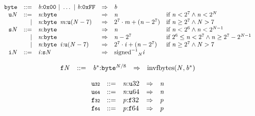 \vspace{1ex}

\vspace{1ex}

$$
\begin{array}{@{}l@{}rrlll@{}l@{}}
& {\mathtt{byte}} &::=& {\mathit{b}}{:}\mathtt{0x00} ~|~ \dots ~|~ {\mathit{b}}{:}\mathtt{0xFF} &\Rightarrow& {\mathit{b}} \\
& {{\mathtt{u}}}{{\mathit{N}}} &::=& {\mathit{n}}{:}{\mathtt{byte}} &\Rightarrow& {\mathit{n}} &\quad
  \mbox{if}~{\mathit{n}} < {2^{7}} \land {\mathit{n}} < {2^{{\mathit{N}}}} \\ &&|&
{\mathit{n}}{:}{\mathtt{byte}}~\,{\mathit{m}}{:}{{\mathtt{u}}}{({\mathit{N}} - 7)} &\Rightarrow& {2^{7}} \cdot {\mathit{m}} + ({\mathit{n}} - {2^{7}}) &\quad
  \mbox{if}~{\mathit{n}} \geq {2^{7}} \land {\mathit{N}} > 7 \\
& {{\mathtt{s}}}{{\mathit{N}}} &::=& {\mathit{n}}{:}{\mathtt{byte}} &\Rightarrow& {\mathit{n}} &\quad
  \mbox{if}~{\mathit{n}} < {2^{6}} \land {\mathit{n}} < {2^{{\mathit{N}} - 1}} \\ &&|&
{\mathit{n}}{:}{\mathtt{byte}} &\Rightarrow& {\mathit{n}} - {2^{7}} &\quad
  \mbox{if}~{2^{6}} \leq {\mathit{n}} < {2^{7}} \land {\mathit{n}} \geq {2^{7}} - {2^{{\mathit{N}} - 1}} \\ &&|&
{\mathit{n}}{:}{\mathtt{byte}}~\,{\mathit{i}}{:}{{\mathtt{u}}}{({\mathit{N}} - 7)} &\Rightarrow& {2^{7}} \cdot {\mathit{i}} + ({\mathit{n}} - {2^{7}}) &\quad
  \mbox{if}~{\mathit{n}} \geq {2^{7}} \land {\mathit{N}} > 7 \\
& {{\mathtt{i}}}{{\mathit{N}}} &::=& {\mathit{i}}{:}{{\mathtt{s}}}{{\mathit{N}}} &\Rightarrow& {{{{{\mathrm{signed}}^{{-1}}}}{}}_{{\mathit{N}}}}{{\mathit{i}}} \\
\end{array}
$$

\vspace{1ex}

$$
\begin{array}{@{}l@{}rrlll@{}l@{}}
& {{\mathtt{f}}}{{\mathit{N}}} &::=& {{\mathit{b}}^\ast}{:}{{\mathtt{byte}}^{{\mathit{N}} / 8}} &\Rightarrow& {\mathrm{invfbytes}}({\mathit{N}}, {{\mathit{b}}^\ast}) \\
\end{array}
$$

\vspace{1ex}

$$
\begin{array}{@{}l@{}rrlll@{}l@{}}
& {\mathtt{u{\scriptstyle32}}} &::=& {\mathit{n}}{:}{{\mathtt{u}}}{32} &\Rightarrow& {\mathit{n}} \\
& {\mathtt{u{\scriptstyle64}}} &::=& {\mathit{n}}{:}{{\mathtt{u}}}{64} &\Rightarrow& {\mathit{n}} \\
& {\mathtt{f{\scriptstyle32}}} &::=& {\mathit{p}}{:}{{\mathtt{f}}}{32} &\Rightarrow& {\mathit{p}} \\
& {\mathtt{f{\scriptstyle64}}} &::=& {\mathit{p}}{:}{{\mathtt{f}}}{64} &\Rightarrow& {\mathit{p}} \\
\end{array}
$$

